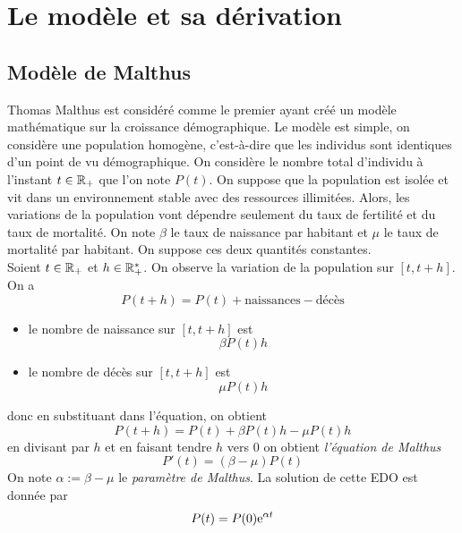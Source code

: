 \section{Le modèle et sa dérivation}

\subsection{Modèle de Malthus}\label{sec_modele_Malthus}
Thomas Malthus est considéré comme le premier ayant créé un modèle mathématique sur la croissance démographique. Le modèle est simple, on considère une population homogène, c'est-à-dire que les individus sont identiques d'un point de vu démographique. On considère le nombre total d'individu à l'instant $t \in \mathbb{R}_+$ que l'on note $P(t)$. On suppose que la population est isolée et vit dans un environnement stable avec des ressources illimitées. Alors, les variations de la population vont dépendre seulement du taux de fertilité et du taux de mortalité. On note $\beta$ le taux de naissance par habitant et $\mu$ le taux de mortalité par habitant. On suppose ces deux quantités constantes.
\\
Soient $t\in \mathbb{R}_+$ et $h \in \mathbb{R}_+^*$. On observe la variation de la population sur $[t,t+h]$. On a 
\begin{equation*}
    P(t+h) = P(t) + \text{naissances} - \text{décès}
\end{equation*}
\begin{itemize}
    \item le nombre de naissance sur $[t,t+h]$ est
    \begin{equation*}
        \beta P(t) h
    \end{equation*}
    \item le nombre de décès sur $[t,t+h]$ est 
    \begin{equation*}
        \mu P(t) h
    \end{equation*}
\end{itemize}
donc en substituant dans l'équation, on obtient 
\begin{equation*}
    P(t+h) = P(t) + \beta P(t) h - \mu P(t) h
\end{equation*}
en divisant par $h$ et en faisant tendre $h$ vers $0$ on obtient \textcolor{astral}{\textit{l'équation de Malthus}}
\begin{equation*}
    P'(t) = (\beta - \mu) P(t)
\end{equation*}
On note $\alpha:=\beta-\mu$ le \textcolor{astral}{\textit{paramètre de Malthus}}. La solution de cette EDO est donnée par 
\begin{equation*}
    P(t) = P(0)\mathrm{e}^{\alpha t}
\end{equation*}
